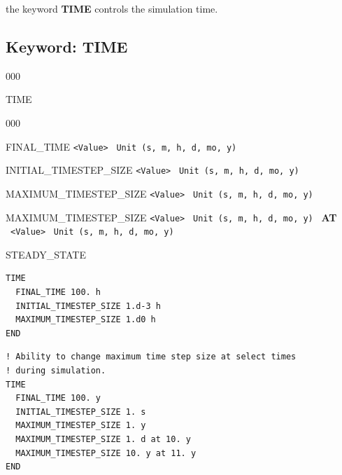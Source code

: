 \documentclass[12pt]{article}
\begin{document}
\hyperlink{target_key}{\return}


\newpage
\protect\hypertarget{target_time}{}

 the keyword {\bf TIME} controls the simulation time.

\subsection{Keyword: TIME}
\begin{deflist}{000}
\item[TIME] ~
\begin{deflist}{000}
\item[FINAL\_TIME] {\tt <Value>} \ {\tt Unit (s, m, h, d, mo, y)}
\item[INITIAL\_TIMESTEP\_SIZE] {\tt <Value>} \ {\tt Unit (s, m, h, d, mo, y)}
\item[MAXIMUM\_TIMESTEP\_SIZE] {\tt <Value>} \ {\tt Unit (s, m, h, d, mo, y)}
\item[MAXIMUM\_TIMESTEP\_SIZE] {\tt <Value>} \ {\tt Unit (s, m, h, d, mo, y)} \ {\bf AT} \ {\tt <Value>} \ {\tt Unit (s, m, h, d, mo, y)}
\item[STEADY\_STATE]
\end{deflist}
\item[\keyend]
\end{deflist}


\begin{mdframed}

\begin{verbatim}
TIME
  FINAL_TIME 100. h
  INITIAL_TIMESTEP_SIZE 1.d-3 h
  MAXIMUM_TIMESTEP_SIZE 1.d0 h
END
\end{verbatim}

\begin{verbatim}
! Ability to change maximum time step size at select times 
! during simulation.
TIME
  FINAL_TIME 100. y
  INITIAL_TIMESTEP_SIZE 1. s
  MAXIMUM_TIMESTEP_SIZE 1. y
  MAXIMUM_TIMESTEP_SIZE 1. d at 10. y
  MAXIMUM_TIMESTEP_SIZE 10. y at 11. y
END
\end{verbatim}

\end{mdframed}

\hyperlink{target_key}{\return}

\end{document}
